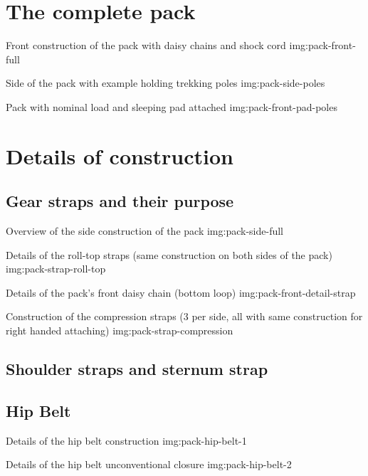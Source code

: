\section{The complete pack}


{Front construction of the pack with daisy chains and shock cord}
{img:pack-front-full}

{Side of the pack with example holding trekking poles}
{img:pack-side-poles}

{Pack with nominal load and sleeping pad attached}
{img:pack-front-pad-poles}

\section{Details of construction}

\subsection{Gear straps and their purpose}

{Overview of the side construction of the pack}
{img:pack-side-full}

{Details of the roll-top straps (same construction on both sides of the pack)}
{img:pack-strap-roll-top}

{Details of the pack's front daisy chain (bottom loop)}
{img:pack-front-detail-strap}

{Construction of the compression straps (3 per side, all with same construction for right handed attaching)}
{img:pack-strap-compression}

\subsection{Shoulder straps and sternum strap}

\subsection{Hip Belt}

{Details of the hip belt construction}
{img:pack-hip-belt-1}

{Details of the hip belt unconventional closure}
{img:pack-hip-belt-2}

